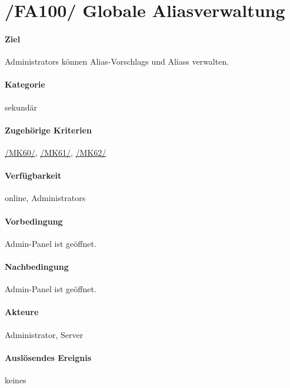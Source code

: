 \section[Globale Aliasverwaltung]{/FA100/ Globale Aliasverwaltung}
\label{/FA100/}
\paragraph{Ziel}
\Glspl{Administrator} können \Glspl{Alias-Vorschlag} und  \Glspl{Alias} verwalten.
\paragraph{Kategorie}
sekundär
\paragraph{Zugehörige Kriterien}
\hyperref[/MK60/]{/MK60/}, \hyperref[/MK61/]{/MK61/}, \hyperref[/MK62/]{/MK62/}
\paragraph{Verfügbarkeit}
online, \Glspl{Administrator}
\paragraph{Vorbedingung}
\Gls{Admin-Panel} ist geöffnet.
\paragraph{Nachbedingung}
\Gls{Admin-Panel} ist geöffnet.
\paragraph{Akteure}
\Gls{Administrator}, \Gls{Server}
\paragraph{Auslösendes Ereignis}
keines
